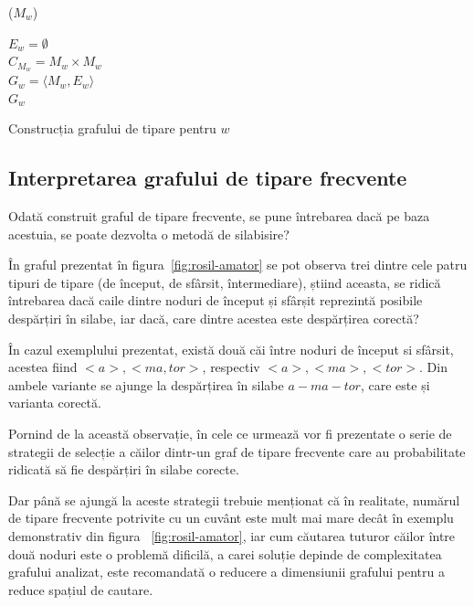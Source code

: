 \begin{algorithm}
\SetAlgoLined
{}

\ppg($M_w$) \\

$E_w = \emptyset$ \\
$C_{M_w} = M_w \times M_w$ \\
$G_w = \langle M_w, E_w \rangle$ \\
\KwRet $G_w$
\vspace{.1cm}

\caption{Construcția grafului de tipare pentru $w$}
\label{algo:buildMatchedPatternGraph}
\end{algorithm}


\subsection{Interpretarea grafului de tipare frecvente}

Odată construit graful de tipare frecvente, se pune întrebarea dacă pe baza acestuia, se poate dezvolta o metodă de silabisire? 

În graful prezentat în figura~\ref{fig:rosil-amator} se pot observa trei dintre cele patru tipuri de tipare (de început, de sfârsit, întermediare), știind aceasta, se ridică întrebarea dacă caile dintre noduri de început și sfârșit reprezintă posibile despărțiri în silabe, iar dacă, care dintre acestea este despărțirea corectă?

În cazul exemplului prezentat, există două căi între noduri de început si sfârsit, acestea fiind $<a>, <ma, tor>$, respectiv $<a>, <ma>, <tor>$. Din ambele variante se ajunge la despărțirea în silabe $a-ma-tor$, care este și varianta corectă. 

Pornind de la această observație, în cele ce urmează vor fi prezentate o serie de strategii de selecție a căilor dintr-un graf de tipare frecvente care au probabilitate ridicată să fie despărțiri în silabe corecte. 

Dar până se ajungă la aceste strategii trebuie menționat că în realitate, numărul de tipare frecvente potrivite cu un cuvânt este mult mai mare decât în exemplu demonstrativ din figura ~\ref{fig:rosil-amator}, iar cum căutarea tuturor căilor între două noduri este o problemă dificilă, a carei soluție depinde de complexitatea grafului analizat, este recomandată o reducere a dimensiunii grafului pentru a reduce spațiul de cautare. 

